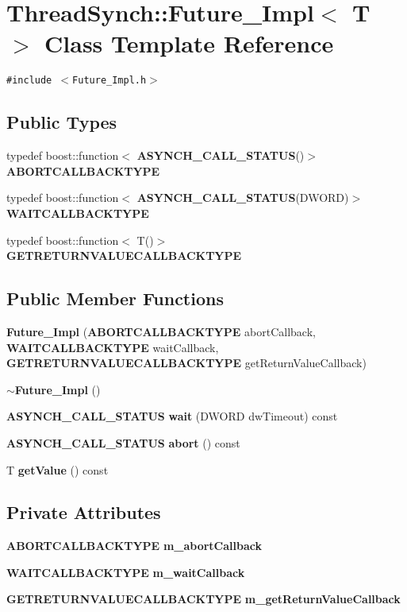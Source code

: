 \section{Thread\-Synch::Future\_\-Impl$<$ T $>$ Class Template Reference}
\label{class_thread_synch_1_1_future___impl}
{\tt \#include $<$Future\_\-Impl.h$>$}

\subsection*{Public Types}
\begin{CompactItemize}
\item 
typedef boost::function$<$ {\bf ASYNCH\_\-CALL\_\-STATUS}()$>$ {\bf ABORTCALLBACKTYPE}
\item 
typedef boost::function$<$ {\bf ASYNCH\_\-CALL\_\-STATUS}(DWORD)$>$ {\bf WAITCALLBACKTYPE}
\item 
typedef boost::function$<$ T()$>$ {\bf GETRETURNVALUECALLBACKTYPE}
\end{CompactItemize}
\subsection*{Public Member Functions}
\begin{CompactItemize}
\item 
{\bf Future\_\-Impl} ({\bf ABORTCALLBACKTYPE} abort\-Callback, {\bf WAITCALLBACKTYPE} wait\-Callback, {\bf GETRETURNVALUECALLBACKTYPE} get\-Return\-Value\-Callback)
\item 
{\bf $\sim$Future\_\-Impl} ()
\item 
{\bf ASYNCH\_\-CALL\_\-STATUS} {\bf wait} (DWORD dw\-Timeout) const 
\item 
{\bf ASYNCH\_\-CALL\_\-STATUS} {\bf abort} () const
\item 
T {\bf get\-Value} () const
\end{CompactItemize}
\subsection*{Private Attributes}
\begin{CompactItemize}
\item 
{\bf ABORTCALLBACKTYPE} {\bf m\_\-abort\-Callback}
\item 
{\bf WAITCALLBACKTYPE} {\bf m\_\-wait\-Callback}
\item 
{\bf GETRETURNVALUECALLBACKTYPE} {\bf m\_\-get\-Return\-Value\-Callback}
\end{CompactItemize}
